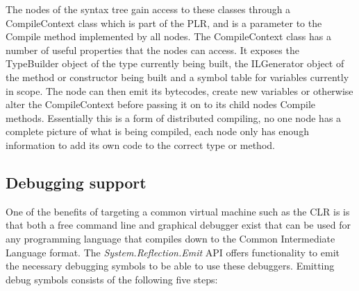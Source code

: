 	The nodes of the syntax tree gain access to these classes through a 
	\textsf{CompileContext} class which is part of the PLR, and is a parameter 
	to the \textsf{Compile} method implemented by all nodes. The 
	\textsf{CompileContext} class has a number of useful properties that the 
	nodes can access. It exposes the \textsf{TypeBuilder} object of the type 
	currently being built, the \textsf{ILGenerator} object of the method or 
	constructor being built and a symbol table for variables currently in scope. 
	The node can then emit its bytecodes, create new variables or otherwise 
	alter the \textsf{CompileContext} before passing it on to its child nodes 
	\textsf{Compile} methods. Essentially this is a form of distributed 
	compiling, no one node has a complete picture of what is being compiled, 
	each node only has enough information to add its own code to the correct 
	type or method.

\subsection{Debugging support}
	
	One of the benefits of targeting a common virtual machine such as the CLR is
	is that both a free command line and graphical debugger exist that can be used
	for any programming language that compiles down to the Common Intermediate
	Language format. The \textit{System.Reflection.Emit} API offers functionality 
	to emit the necessary debugging symbols to be able to use these debuggers.
 	Emitting debug symbols consists of the following five steps:
 	
